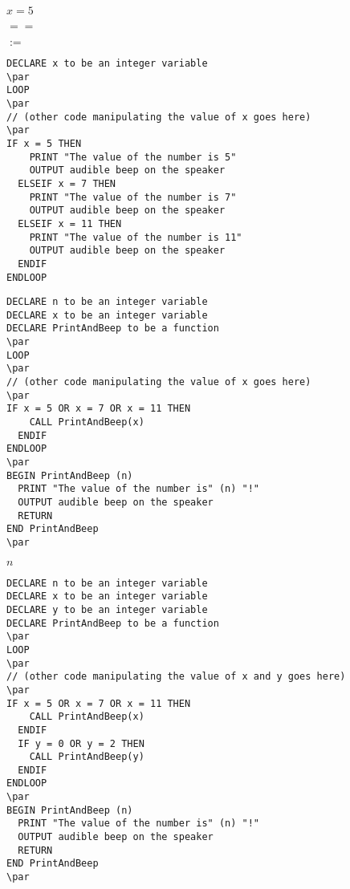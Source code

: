 \documentclass[12pt,a4paper,margin=2cm]{book}
\def\lthtmlcheckvsize{\ifdim\ht\sizebox<\vsize 
  \ifdim\wd\sizebox<\hsize\expandafter\hfill\fi \expandafter\vfill
  \else\expandafter\vss\fi}%
\begin{document}
{\newpage\clearpage
{}%
$ x = 5$%
\lthtmlindisplaymathZ
\lthtmlcheckvsize\clearpage}

{\newpage\clearpage
{}%
$ ==$%
\lthtmlindisplaymathZ
\lthtmlcheckvsize\clearpage}

{\newpage\clearpage
{}%
$ :=$%
\lthtmlindisplaymathZ
\lthtmlcheckvsize\clearpage}

{\newpage\clearpage
{}%
\begin{lstlisting}
DECLARE x to be an integer variable
\par
LOOP
\par
// (other code manipulating the value of x goes here)
\par
IF x = 5 THEN 
    PRINT "The value of the number is 5"
    OUTPUT audible beep on the speaker
  ELSEIF x = 7 THEN
    PRINT "The value of the number is 7"
    OUTPUT audible beep on the speaker
  ELSEIF x = 11 THEN
    PRINT "The value of the number is 11"
    OUTPUT audible beep on the speaker
  ENDIF
ENDLOOP
\end{lstlisting}%
\lthtmlfigureZ
\lthtmlcheckvsize\clearpage}

{\newpage\clearpage
{}%
\begin{lstlisting}
DECLARE n to be an integer variable
DECLARE x to be an integer variable
DECLARE PrintAndBeep to be a function
\par
LOOP
\par
// (other code manipulating the value of x goes here)
\par
IF x = 5 OR x = 7 OR x = 11 THEN 
    CALL PrintAndBeep(x)
  ENDIF
ENDLOOP
\par
BEGIN PrintAndBeep (n)
  PRINT "The value of the number is" (n) "!"
  OUTPUT audible beep on the speaker
  RETURN
END PrintAndBeep
\par
\end{lstlisting}%
\lthtmlfigureZ
\lthtmlcheckvsize\clearpage}

{\newpage\clearpage
{}%
$ n$%
\lthtmlindisplaymathZ
\lthtmlcheckvsize\clearpage}

{\newpage\clearpage
{}%
\begin{lstlisting}
DECLARE n to be an integer variable
DECLARE x to be an integer variable
DECLARE y to be an integer variable
DECLARE PrintAndBeep to be a function
\par
LOOP
\par
// (other code manipulating the value of x and y goes here)
\par
IF x = 5 OR x = 7 OR x = 11 THEN 
    CALL PrintAndBeep(x)
  ENDIF
  IF y = 0 OR y = 2 THEN 
    CALL PrintAndBeep(y)
  ENDIF
ENDLOOP
\par
BEGIN PrintAndBeep (n)
  PRINT "The value of the number is" (n) "!"
  OUTPUT audible beep on the speaker
  RETURN
END PrintAndBeep
\par
\end{lstlisting}%
\lthtmlfigureZ
\lthtmlcheckvsize\clearpage}
\end{document}
